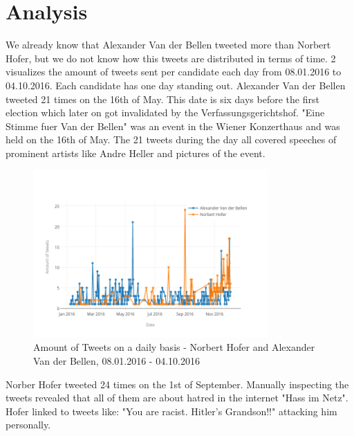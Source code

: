 \documentclass{llncs}
\begin{document}
\section{Analysis}
We already know that Alexander Van der Bellen tweeted more than Norbert Hofer, but we do not know how this tweets are distributed in terms of time. \figurename{2} visualizes the amount of tweets sent per candidate each day from 08.01.2016 to 04.10.2016. Each candidate has one day standing out. Alexander Van der Bellen tweeted 21 times on the 16th of May. This date is six days before the first election which later on got invalidated by the Verfassungsgerichtshof. "Eine Stimme fuer Van der Bellen" was an event in the Wiener Konzerthaus and was held on the 16th of May. The 21 tweets during the day all covered speeches of prominent artists like Andre Heller and pictures of the event.   
\begin{figure}[htbp] 
	\centering
	\includegraphics[width=0.8\textwidth]{grafics/tweet_count.png}
	\caption{Amount of Tweets on a daily basis - Norbert Hofer and Alexander Van der Bellen, 08.01.2016 - 04.10.2016}
	\label{fig:Amount of Tweets on a daily basis}
\end{figure}

Norber Hofer tweeted 24 times on the 1st of September. Manually inspecting the tweets revealed that all of them are about hatred in the internet "Hass im Netz". Hofer linked to tweets like: "You are racist. Hitler's Grandson!!" attacking him personally. 
\end{document}
